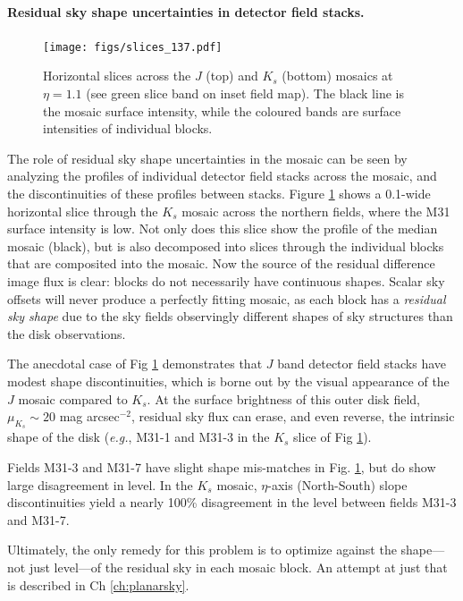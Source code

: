 \documentclass[iop]{emulateapj}
\newcommand{\eg}{\textit{e.g.}}
\begin{document}
\paragraph{Residual sky shape uncertainties in detector field stacks.}

\begin{figure}[t]
    \centering
        \texttt{[image: figs/slices\_137.pdf]}
    \caption[Horizontal slices across the $J$ and $K_s$ mosaics at $\eta=1.1$]{Horizontal slices across the $J$ (top) and $K_s$ (bottom) mosaics at $\eta=1.1$ (see green slice band on inset field map). The black line is the mosaic surface intensity, while the coloured bands are surface intensities of individual blocks.}
    \label{fig:slices_137}
\end{figure}

The role of residual sky shape uncertainties in the mosaic can be seen by analyzing the profiles of individual detector field stacks across the mosaic, and the discontinuities of these profiles between stacks. Figure \ref{fig:slices_137} shows a 0.1\arcdeg -wide horizontal slice through the $K_s$ mosaic across the northern fields, where the M31 surface intensity is low. Not only does this slice show the profile of the median mosaic (black), but is also decomposed into slices through the individual blocks that are composited into the mosaic. Now the source of the residual difference image flux is clear: blocks do not necessarily have continuous shapes. Scalar sky offsets will never produce a perfectly fitting mosaic, as each block has a \emph{residual sky shape} due to the sky fields observingly different shapes of sky structures than the disk observations.

The anecdotal case of Fig \ref{fig:slices_137} demonstrates that $J$ band detector field stacks have modest shape discontinuities, which is borne out by the visual appearance of the $J$ mosaic compared to $K_s$. At the surface brightness of this outer disk field, $\mu_{K_s}\sim 20$ mag arcsec$^{-2}$, residual sky flux can erase, and even reverse, the intrinsic shape of the disk (\eg, M31-1 and M31-3 in the $K_s$ slice of Fig \ref{fig:slices_137}).

Fields M31-3 and M31-7 have slight shape mis-matches in Fig. \ref{fig:slices_137}, but do show large disagreement in level. In the $K_s$ mosaic, $\eta$-axis (North-South) slope discontinuities yield a nearly 100\% disagreement in the level between fields M31-3 and M31-7.

Ultimately, the only remedy for this problem is to optimize against the shape---not just level---of the residual sky in each mosaic block. An attempt at just that is described in Ch \ref{ch:planarsky}.



\end{document}
